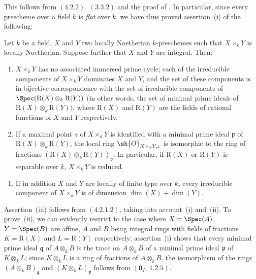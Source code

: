 This follows from $(4.2.2)$, $(3.3.2)$ and the proof of .
In particular, since every prescheme over a field $k$ is \emph{flat} over $k$, we have thus proved assertion~(i) of the following:

\begin{proposition}[4.2.4]
\label{IV.4.2.4}
Let $k$ be a field, $X$ and $Y$ two locally Noetherian $k$-preschemes such that $X\times_k Y$ is locally Noetherian.
Suppose further that $X$ and $Y$ are integral.
Then:
\begin{enumerate}[label=(\roman*)]
  \item $X\times_k Y$ has no associated immersed prime cycle; each of the irreducible components of $X\times_k Y$ dominates $X$ and $Y$, and the set of these components is in bijective correspondence with the set of irreducible components of $\Spec(\mathrm{R}(X)\otimes_k\mathrm{R}(Y))$ (in other words, the set of minimal prime ideals of $\mathrm{R}(X)\otimes_k\mathrm{R}(Y))$, where $\mathrm{R}(X)$ and $\mathrm{R}(Y)$ are the fields of rational functions of $X$ and $Y$ respectively.
  \item If a maximal point $z$ of $X\times_k Y$ is identified with a minimal prime ideal $\mathfrak{p}$ of $\mathrm{R}(X)\otimes_k\mathrm{R}(Y)$, the local ring $\sh{O}_{X\times_k Y,z}$ is isomorphic to the ring of fractions $(\mathrm{R}(X)\otimes_k\mathrm{R}(Y))_\mathfrak{p}$.
In particular, if $\mathrm{R}(X)$ or $\mathrm{R}(Y)$ is separable over $k$, $X\times_k Y$ is reduced.
\end{enumerate}
\end{proposition}

\begin{enumerate}
  \item[\rm(iii)] If in addition $X$ and $Y$ are locally of finite type over $k$, every irreducible component of $X\times_k Y$ is of dimension $\dim(X)+\dim(Y)$.
\end{enumerate}

Assertion~(iii) follows from $(4.2.1.2)$, taking into account~(i) and~(ii).
To prove~(ii), we can evidently restrict to the case where $X=\Spec(A)$, $Y=\Spec(B)$ are affine, $A$ and $B$ being integral rings with fields of fractions $K=\mathrm{R}(X)$ and $L=\mathrm{R}(Y)$ respectively; assertion~(i) shows that every minimal prime ideal $\mathfrak{q}$ of $A\otimes_k B$ is the trace on $A\otimes_k B$ of a minimal prime ideal $\mathfrak{p}$ of $K\otimes_k L$; since $K\otimes_k L$ is a ring of fractions of $A\otimes_k B$, the isomorphism of the rings $(A\otimes_k B)_\mathfrak{q}$ and $(K\otimes_k L)_\mathfrak{p}$ follows from $(\mathbf{0}_I,\,1.2.5)$.

